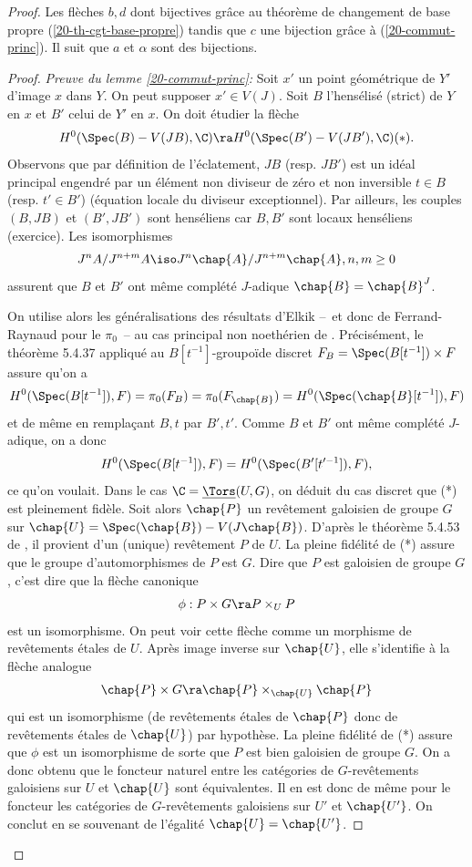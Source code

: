 \documentclass[10pt]{../fichiers-configuration-latex/smfart}
\begin{document}
\begin{proof}
Les flèches $b,d$ dont bijectives grâce au théorème de changement de base propre
(\ref{20-th-cgt-base-propre}) tandis que $c$ une bijection grâce à (\ref{20-commut-princ}). Il suit
que $a$ et $\alpha$ sont des bijections.

\begin{proof}\textit{Preuve du lemme \ref{20-commut-princ}:} Soit $x'$ un point géométrique de $Y'$
d'image $x$ dans $Y$. On peut supposer $x'\in V(J)$. Soit $B$ l'hensélisé (strict) de $Y$ en $x$ et
$B'$ celui de $Y'$ en $x$. On doit étudier la flèche $$H^0(\Spec(B)-V(JB),{\C})\ra
H^0(\Spec(B')-V(JB'),{\C})\leqno (*).$$ Observons que par définition de l'éclatement, $JB$ (resp.
$JB'$) est un idéal principal engendré par un élément non diviseur de zéro et non inversible $t\in
B$ (resp. $t'\in B'$) (équation locale du diviseur exceptionnel). Par ailleurs, les couples $(B,JB)$
et $(B',JB')$ sont henséliens car $B,B'$ sont locaux henséliens (exercice). Les isomorphismes
$$J^nA/J^{n+m}A\iso J^n\chap{A}/J^{n+m}\chap{A},n,m\geq 0$$ assurent  que $B$ et $B'$ ont même
complété $J$-adique $\chap{B}=\chap{B}^J$.

On utilise alors les généralisations des résultats d'Elkik \cite{Elk73} -- et donc de
Ferrand-Raynaud pour le $\pi_0$ -- au cas principal non noethérien de \cite{ART@Gabber-Ramero}.
Précisément, le théorème 5.4.37 appliqué au $B[t^{-1}]$-groupoïde discret
$F_B=\Spec(B[t^{-1}])\times F$ assure qu'on a
$$H^0(\Spec(B[t^{-1}]),F)=\pi_0(F_B)=\pi_0(F_{\chap{B}})=H^0(\Spec(\chap{B}[t^{-1}]),F)$$ et de même
en remplaçant $B,t$ par $B',t'$. Comme $B$ et $B'$ ont même complété $J$-adique, on a donc
$$H^0(\Spec(B[t^{-1}]),F)=H^0(\Spec(B'[t'^{-1}]),F),$$ ce qu'on voulait. Dans le cas
$\C=\underline{\Tors}(U,G)$, on déduit du cas discret que (*) est pleinement fidèle. Soit alors
$\chap{P}$ un revêtement galoisien de groupe $G$ sur $\chap{U}=\Spec(\chap{B})-V(J\chap{B})$.
D'après le théorème 5.4.53 de  \cite{ART@Gabber-Ramero}, il provient d'un (unique) revêtement $P$ de
$U$. La pleine fidélité de (*) assure que le groupe d'automorphismes de $P$ est $G$. Dire que $P$
est galoisien de groupe $G$, c'est dire que la flèche canonique $$\phi: P\times G\ra P\times_UP$$
est un isomorphisme. On peut voir cette flèche comme un morphisme de revêtements étales de $U$.
Après image inverse sur $\chap{U}$, elle s'identifie à la flèche analogue $$\chap{P}\times G\ra
\chap{P}\times_{\chap{U}}\chap{P}$$ qui est un isomorphisme (de revêtements étales de $\chap{P}$
donc de revêtements étales de $\chap{U}$) par hypothèse. La pleine fidélité de (*) assure que $\phi$
est un isomorphisme de sorte que $P$ est bien galoisien de groupe $G$. On a donc obtenu que le
foncteur naturel entre les catégories de $G$-revêtements galoisiens sur $U$ et $\chap{U}$ sont
équivalentes. Il en est donc de même pour le foncteur les catégories de $G$-revêtements galoisiens
sur $U'$ et $\chap{U'}$. On conclut en se souvenant de l'égalité $\chap{U}=\chap{U'}$. \end{proof}

\end{proof}
\end{document}

